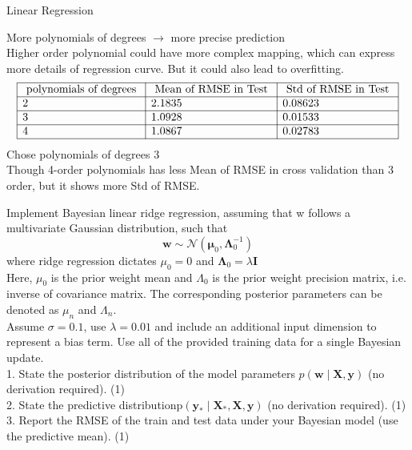 \documentclass[
	ngerman,
     solution=true
	]{tudaexercise}
\begin{document}
\begin{task}{Linear Regression}
\begin{subtask}[1c)]
More polynomials of degrees $\rightarrow$ more precise prediction\\
Higher order polynomial could have more complex mapping, which can express more details of regression curve. But it could also lead to overfitting.\\
\[
\begin{array}{|l|l|l|}
\hline \text { polynomials of degrees } & \text { Mean of RMSE in Test } & \text { Std of RMSE in Test } \\
\hline 2 & 2.1835 & 0.08623 \\
\hline 3 & 1.0928 & 0.01533 \\
\hline 4 & 1.0867 & 0.02783 \\
\hline
\end{array}
\]
Chose polynomials of degrees 3 \\
Though 4-order polynomials has less Mean of RMSE in cross validation than 3 order, but it shows more Std of RMSE.
\end{subtask}
\begin{subtask}[1d)]
Implement Bayesian linear ridge regression, assuming that w follows a multivariate Gaussian distribution, such that
\[
\mathbf{w} \sim \mathcal{N}\left(\boldsymbol{\mu}_{0}, \boldsymbol{\Lambda}_{0}^{-1}\right)
\]
where ridge regression dictates $\mu_0 = 0$ and $\mathbf{\Lambda}_{0}=\lambda \mathbf{I} $\\
Here, $\mu_0$ is the prior weight mean and $\Lambda_0$ is the prior weight precision matrix, i.e. inverse of covariance matrix. The
corresponding posterior parameters can be denoted as $\mu_n$ and $\Lambda_n$.\\
Assume $\sigma = 0.1$, use $\lambda = 0.01$ and include an additional input dimension to represent a bias term. Use all of the
provided training data for a single Bayesian update.\\[15pt]
1. State the posterior distribution of the model parameters $p(\mathbf{w} \mid \mathbf{X}, \mathbf{y})$ (no derivation required). (1)\\[15pt]
2. State the predictive distributionp$\left(\mathbf{y}_{*} \mid \mathbf{X}_{*}, \mathbf{X}, \mathbf{y}\right)$ (no derivation required). (1)\\[15pt]
3. Report the RMSE of the train and test data under your Bayesian model (use the predictive mean). (1)\\[15pt]

\end{subtask}
\end{task}
\end{document}
